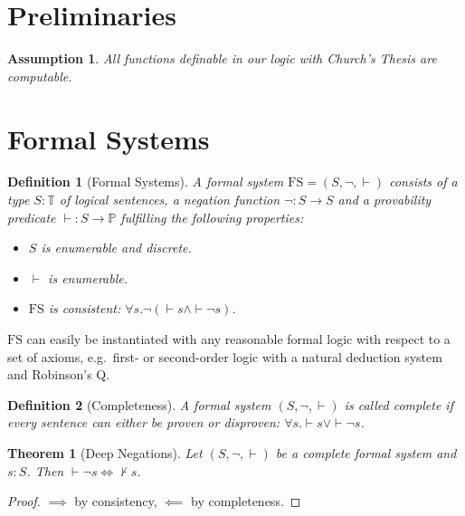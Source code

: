 \documentclass{scrartcl}
\newtheorem{definition}{Definition}
\newtheorem{assumption}{Assumption}
\newtheorem{theorem}{Theorem}
\newcommand{\FS}{\mathrm{FS}}
\newcommand{\TT}{\mathbb{T}}
\newcommand{\PP}{\mathbb{P}}
\let\oldvdash\vdash
\renewcommand{\vdash}{{\oldvdash}}
\let\oldnvdash\nvdash
\renewcommand{\nvdash}{{\oldnvdash}}
\begin{document}
\section{Preliminaries}

\begin{assumption}
  All functions definable in our logic with Church's Thesis are computable.
\end{assumption}

\section{Formal Systems}

\begin{definition}[Formal Systems]
  A formal system $\FS = (S, \neg, \vdash)$ consists of a type $S : \TT$ of logical sentences, a negation function $\neg : S \to S$ and a provability predicate $\vdash : S \to \PP$ fulfilling the following properties:
  \begin{itemize}
    \item $S$ is enumerable and discrete.
    \item $\vdash$ is enumerable.
    \item $\mathrm{FS}$ is consistent: $\forall s. \neg(\vdash s \land \vdash \neg s)$.
  \end{itemize}
\end{definition}

$\FS$ can easily be instantiated with any reasonable formal logic with respect to a set of axioms, e.g.\ first- or second-order logic with a natural deduction system and Robinson's Q.

\begin{definition}[Completeness]
  A formal system $(S, \neg, \vdash)$ is called complete if every sentence can either be proven or disproven: $\forall s. \vdash s \lor \vdash \neg s$.
\end{definition}
\begin{theorem}[Deep Negations]\label{thm:dn}
  Let $(S, \neg, \vdash)$ be a complete formal system and $s : S$. Then $\vdash \neg s \iff \nvdash s$.
\end{theorem}
\begin{proof}
  $\implies$ by consistency, $\impliedby$ by completeness.
\end{proof}
\end{document}
